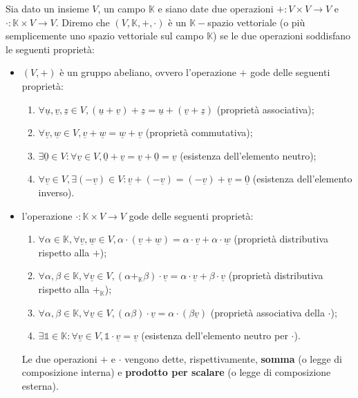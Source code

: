 \begin{definition}
    \label{def:sp_vett} Sia dato un insieme $V$, un campo $\mathbb{K}$ e siano date due operazioni $+: V \times V \to V$ e $\cdot: \mathbb{K} \times V \to V$. Diremo che $(V, \mathbb{K}, +, \cdot)$ è un $\mathbb{K}-$spazio vettoriale (o più semplicemente uno spazio vettoriale sul campo $\mathbb{K}$) se le due operazioni soddisfano le seguenti proprietà:
    \begin{itemize}
        \item $(V, +)$ è un gruppo abeliano, ovvero l'operazione $+$ gode delle seguenti proprietà:
        \begin{enumerate}[label=\protect\circled{\arabic*}]
            \item $\forall \underline{u}, \underline{v}, \underline{z} \in V, (\underline{u} + \underline{v}) + \underline{z} = \underline{u} + (\underline{v} + \underline{z})$ (proprietà associativa);
            \item $\forall \underline{v}, \underline{w} \in V, \underline{v} + \underline{w} = \underline{w} + \underline{v}$ (proprietà commutativa);
            \item $\exists \underline{0} \in V : \forall \underline{v} \in V, \underline{0} + \underline{v} = \underline{v} + \underline{0} = \underline{v}$ (esistenza dell'elemento neutro);
            \item $\forall \underline{v} \in V, \exists (-\underline{v}) \in V : \underline{v} + (-\underline{v}) = (-\underline{v}) + \underline{v} = \underline{0}$ (esistenza dell'elemento inverso).
        \end{enumerate}
        \item l'operazione $\cdot: \mathbb{K} \times V \to V$ gode delle seguenti proprietà:
        \begin{enumerate}[label=\protect\circled{\arabic*}]
            \item $\forall \alpha \in \mathbb{K}, \forall \underline{v}, \underline{w} \in V, \alpha \cdot (\underline{v} + \underline{w}) = \alpha \cdot \underline{v} + \alpha \cdot \underline{w}$ (proprietà distributiva rispetto alla $+$);
            \item $\forall \alpha, \beta \in \mathbb{K}, \forall \underline{v} \in V, (\alpha +_{\mathbb{K}} \beta) \cdot \underline{v} = \alpha \cdot \underline{v} + \beta \cdot \underline{v}$ (proprietà distributiva rispetto alla $+_\mathbb{K}$);
            \item $\forall \alpha, \beta \in \mathbb{K}, \forall \underline{v} \in V, (\alpha \beta) \cdot \underline{v} = \alpha \cdot (\beta \underline{v})$ (proprietà associativa della $\cdot$);
            \item $\exists \mathds{1} \in \mathbb{K} : \forall \underline{v} \in V, \mathds{1} \cdot \underline{v} = \underline{v}$ (esistenza dell'elemento neutro per $\cdot$).
        \end{enumerate}
        Le due operazioni $+$ e $\cdot$ vengono dette, rispettivamente, \textbf{somma} (o legge di composizione interna) e \textbf{prodotto per scalare} (o legge di composizione esterna).
    \end{itemize}
\end{definition}

